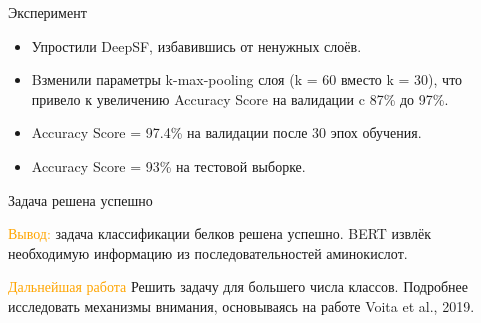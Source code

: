 \documentclass{beamer}
\begin{document}
\begin{frame}{Эксперимент}



\begin{itemize}
  \item Упростили DeepSF, избавившись от ненужных слоёв.
  
  \item Bзменили параметры k-max-pooling слоя (k = 60 вместо k = 30), что привело к увеличению Accuracy Score на валидации c 87\% до 97\%.
  
  \item Accuracy Score = 97.4\% на валидации после 30 эпох обучения. 
  
  \item Accuracy Score = 93\% на тестовой выборке. 
\end{itemize}

\bigskip


\end{frame}


\begin{frame}{Задача решена успешно}
 
\begin{block}{\textcolor{orange}{Вывод:}}
 задача классификации белков решена успешно. BERT извлёк необходимую информацию из последовательностей аминокислот. 
\end{block}
\begin{block}{\textcolor{orange}{Дальнейшая работа}}
Решить задачу для большего числа классов. Подробнее исследовать механизмы внимания, основываясь на работе Voita et al., 2019. 
\end{block}
\end{frame}


\end{document}
